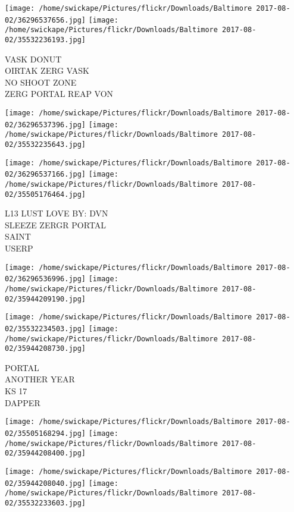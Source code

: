 \documentclass[10pt,letterpaper]{article}
\begin{document}
\texttt{[image: /home/swickape/Pictures/flickr/Downloads/Baltimore 2017-08-02/36296537656.jpg]}
\texttt{[image: /home/swickape/Pictures/flickr/Downloads/Baltimore 2017-08-02/35532236193.jpg]}

VASK DONUT\\
OIRTAK ZERG VASK\\
NO SHOOT ZONE\\
ZERG PORTAL REAP VON\\
\pagebreak

\texttt{[image: /home/swickape/Pictures/flickr/Downloads/Baltimore 2017-08-02/36296537396.jpg]}
\texttt{[image: /home/swickape/Pictures/flickr/Downloads/Baltimore 2017-08-02/35532235643.jpg]}

\texttt{[image: /home/swickape/Pictures/flickr/Downloads/Baltimore 2017-08-02/36296537166.jpg]}
\texttt{[image: /home/swickape/Pictures/flickr/Downloads/Baltimore 2017-08-02/35505176464.jpg]}

L13 LUST LOVE BY: DVN\\
SLEEZE ZERGR PORTAL\\
SAINT\\
USERP\\
\pagebreak

\texttt{[image: /home/swickape/Pictures/flickr/Downloads/Baltimore 2017-08-02/36296536996.jpg]}
\texttt{[image: /home/swickape/Pictures/flickr/Downloads/Baltimore 2017-08-02/35944209190.jpg]}

\texttt{[image: /home/swickape/Pictures/flickr/Downloads/Baltimore 2017-08-02/35532234503.jpg]}
\texttt{[image: /home/swickape/Pictures/flickr/Downloads/Baltimore 2017-08-02/35944208730.jpg]}

PORTAL\\
ANOTHER YEAR\\
KS 17\\
DAPPER\\
\pagebreak

\texttt{[image: /home/swickape/Pictures/flickr/Downloads/Baltimore 2017-08-02/35505168294.jpg]}
\texttt{[image: /home/swickape/Pictures/flickr/Downloads/Baltimore 2017-08-02/35944208400.jpg]}

\texttt{[image: /home/swickape/Pictures/flickr/Downloads/Baltimore 2017-08-02/35944208040.jpg]}
\texttt{[image: /home/swickape/Pictures/flickr/Downloads/Baltimore 2017-08-02/35532233603.jpg]}
\end{document}
